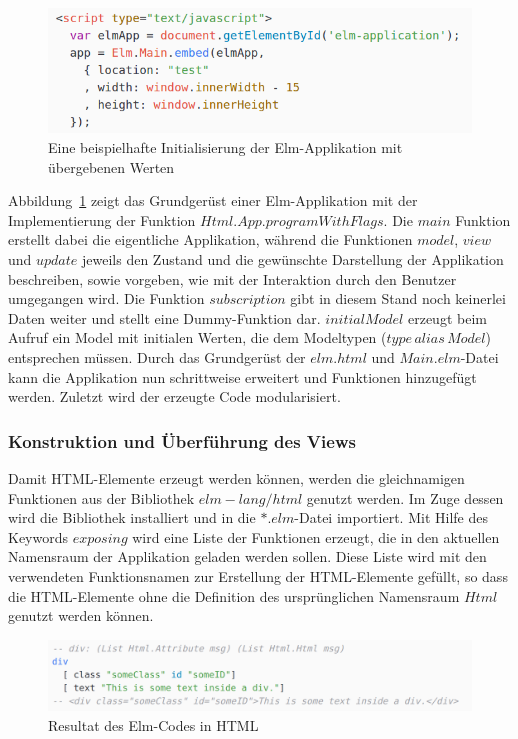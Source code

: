 \begin{figure}[ht]
\centering\includegraphics[scale=0.6]{img/programWithFlags_pass_data.png}
\caption{Eine beispielhafte Initialisierung der Elm-Applikation mit übergebenen Werten}\label{fig:programWithFlags}
\end{figure}
Abbildung~\ref{fig:programWithFlags} zeigt das Grundgerüst einer Elm-Applikation mit der Implementierung der Funktion $Html.App.programWithFlags$. Die $main$ Funktion erstellt dabei die eigentliche Applikation, während die Funktionen $model$, $view$ und $update$ jeweils den Zustand und die gewünschte Darstellung der Applikation beschreiben, sowie vorgeben, wie mit der Interaktion durch den Benutzer umgegangen wird. Die Funktion $subscription$ gibt in diesem Stand noch keinerlei Daten weiter und stellt eine Dummy-Funktion dar. $initialModel$ erzeugt beim Aufruf ein Model mit initialen Werten, die dem Modeltypen ($type\,alias\,Model$) entsprechen müssen. Durch das Grundgerüst der $elm.html$ und $Main.elm$-Datei kann die Applikation nun schrittweise erweitert und Funktionen hinzugefügt werden. Zuletzt wird der erzeugte Code modularisiert.
\fi
\subsubsection{Konstruktion und Überführung des Views}
\label{sec:Konstruktion des Views}
Damit \ac{HTML}-Elemente erzeugt werden können, werden die gleichnamigen Funktionen aus der Bibliothek $elm-lang/html$ genutzt werden. Im Zuge dessen wird die Bibliothek installiert und in die $*.elm$-Datei importiert. Mit Hilfe des Keywords $exposing$ wird eine Liste der Funktionen erzeugt, die in den aktuellen Namensraum der Applikation geladen werden sollen. Diese Liste wird mit den verwendeten Funktionsnamen zur Erstellung der \ac{HTML}-Elemente gefüllt, so dass die \ac{HTML}-Elemente ohne die Definition des ursprünglichen Namensraum $Html$ genutzt werden können.
\begin{figure}[htb]
\centering
\includegraphics[scale=0.3]{img/div_elm_to_html.png}
\caption{Resultat des Elm-Codes in \ac{HTML}}\label{fig:elm-to-html}
\end{figure}

